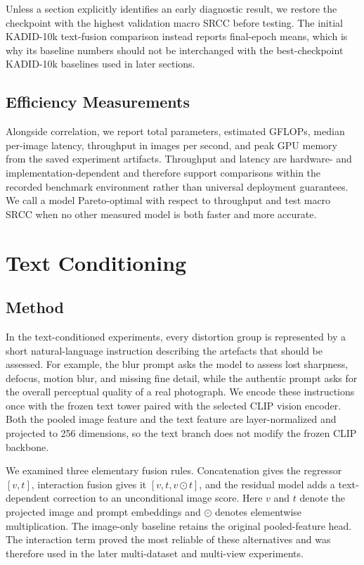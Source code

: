 \documentclass{article}
\begin{document}
Unless a section explicitly identifies an early diagnostic result, we restore the checkpoint with the highest validation macro SRCC before testing. The initial KADID-10k text-fusion comparison instead reports final-epoch means, which is why its baseline numbers should not be interchanged with the best-checkpoint KADID-10k baselines used in later sections.

\subsection{Efficiency Measurements}

Alongside correlation, we report total parameters, estimated GFLOPs, median per-image latency, throughput in images per second, and peak GPU memory from the saved experiment artifacts. Throughput and latency are hardware- and implementation-dependent and therefore support comparisons within the recorded benchmark environment rather than universal deployment guarantees. We call a model Pareto-optimal with respect to throughput and test macro SRCC when no other measured model is both faster and more accurate.

\section{Text Conditioning}

\subsection{Method}

In the text-conditioned experiments, every distortion group is represented by a short natural-language instruction describing the artefacts that should be assessed. For example, the blur prompt asks the model to assess lost sharpness, defocus, motion blur, and missing fine detail, while the authentic prompt asks for the overall perceptual quality of a real photograph. We encode these instructions once with the frozen text tower paired with the selected CLIP vision encoder. Both the pooled image feature and the text feature are layer-normalized and projected to 256 dimensions, so the text branch does not modify the frozen CLIP backbone.

We examined three elementary fusion rules. Concatenation gives the regressor $[v,t]$, interaction fusion gives it $[v,t,v\odot t]$, and the residual model adds a text-dependent correction to an unconditional image score. Here $v$ and $t$ denote the projected image and prompt embeddings and $\odot$ denotes elementwise multiplication. The image-only baseline retains the original pooled-feature head. The interaction term proved the most reliable of these alternatives and was therefore used in the later multi-dataset and multi-view experiments.
\end{document}
